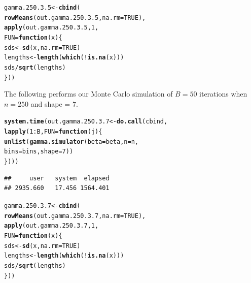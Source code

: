 \documentclass[11pt]{article}\usepackage[]{graphicx}\usepackage[]{color}
\makeatletter
\newcommand{\hlnum}[1]{\textcolor[rgb]{0.686,0.059,0.569}{#1}}%
\newcommand{\hlopt}[1]{\textcolor[rgb]{0,0,0}{#1}}%
\newcommand{\hlstd}[1]{\textcolor[rgb]{0.345,0.345,0.345}{#1}}%
\newcommand{\hlkwa}[1]{\textcolor[rgb]{0.161,0.373,0.58}{\textbf{#1}}}%
\newcommand{\hlkwb}[1]{\textcolor[rgb]{0.69,0.353,0.396}{#1}}%
\newcommand{\hlkwc}[1]{\textcolor[rgb]{0.333,0.667,0.333}{#1}}%
\newcommand{\hlkwd}[1]{\textcolor[rgb]{0.737,0.353,0.396}{\textbf{#1}}}%
\newenvironment{kframe}{%
 \def\at@end@of@kframe{}%
 \ifinner\ifhmode%
  \def\at@end@of@kframe{\end{minipage}}%
  \begin{minipage}{\columnwidth}%
 \fi\fi%
 \def\FrameCommand##1{\hskip\@totalleftmargin \hskip-\fboxsep
 \colorbox{shadecolor}{##1}\hskip-\fboxsep
     \hskip-\linewidth \hskip-\@totalleftmargin \hskip\columnwidth}%
 \MakeFramed {\advance\hsize-\width
   \@totalleftmargin\z@ \linewidth\hsize
   \@setminipage}}%
 {\par\unskip\endMakeFramed%
 \at@end@of@kframe}
\newenvironment{knitrout}{}{} %
\makeatother
\begin{document}
\begin{knitrout}
\color{fgcolor}\begin{kframe}
\begin{alltt}
\hlstd{gamma.250.3.5} \hlkwb{<-} \hlkwd{cbind}\hlstd{(}
  \hlkwd{rowMeans}\hlstd{(out.gamma.250.3.5,} \hlkwc{na.rm} \hlstd{=} \hlnum{TRUE}\hlstd{),}
  \hlkwd{apply}\hlstd{(out.gamma.250.3.5,} \hlnum{1}\hlstd{,}
  \hlkwc{FUN} \hlstd{=} \hlkwa{function}\hlstd{(}\hlkwc{x}\hlstd{)\{}
    \hlstd{sds} \hlkwb{<-} \hlkwd{sd}\hlstd{(x,} \hlkwc{na.rm} \hlstd{=} \hlnum{TRUE}\hlstd{)}
    \hlstd{lengths} \hlkwb{<-} \hlkwd{length}\hlstd{(}\hlkwd{which}\hlstd{(}\hlopt{!}\hlkwd{is.na}\hlstd{(x)))}
    \hlstd{sds} \hlopt{/} \hlkwd{sqrt}\hlstd{(lengths)}
  \hlstd{\}))}
\end{alltt}
\end{kframe}
\end{knitrout}

The following performs our Monte Carlo simulation of $B = 50$ iterations 
when $n = 250$ and shape = $7$.

\begin{knitrout}
\color{fgcolor}\begin{kframe}
\begin{alltt}
\hlkwd{system.time}\hlstd{(out.gamma.250.3.7} \hlkwb{<-} \hlkwd{do.call}\hlstd{(cbind,}
  \hlkwd{lapply}\hlstd{(}\hlnum{1}\hlopt{:}\hlstd{B,} \hlkwc{FUN} \hlstd{=} \hlkwa{function}\hlstd{(}\hlkwc{j}\hlstd{)\{}
    \hlkwd{unlist}\hlstd{(}\hlkwd{gamma.simulator}\hlstd{(}\hlkwc{beta} \hlstd{= beta,} \hlkwc{n} \hlstd{= n,}
      \hlkwc{bins} \hlstd{= bins,} \hlkwc{shape} \hlstd{=} \hlnum{7}\hlstd{))}
\hlstd{\})))}
\end{alltt}
\begin{verbatim}
##     user   system  elapsed 
## 2935.660   17.456 1564.401
\end{verbatim}
\end{kframe}
\end{knitrout}

\begin{knitrout}
\color{fgcolor}\begin{kframe}
\begin{alltt}
\hlstd{gamma.250.3.7} \hlkwb{<-} \hlkwd{cbind}\hlstd{(}
  \hlkwd{rowMeans}\hlstd{(out.gamma.250.3.7,} \hlkwc{na.rm} \hlstd{=} \hlnum{TRUE}\hlstd{),}
  \hlkwd{apply}\hlstd{(out.gamma.250.3.7,} \hlnum{1}\hlstd{,}
  \hlkwc{FUN} \hlstd{=} \hlkwa{function}\hlstd{(}\hlkwc{x}\hlstd{)\{}
    \hlstd{sds} \hlkwb{<-} \hlkwd{sd}\hlstd{(x,} \hlkwc{na.rm} \hlstd{=} \hlnum{TRUE}\hlstd{)}
    \hlstd{lengths} \hlkwb{<-} \hlkwd{length}\hlstd{(}\hlkwd{which}\hlstd{(}\hlopt{!}\hlkwd{is.na}\hlstd{(x)))}
    \hlstd{sds} \hlopt{/} \hlkwd{sqrt}\hlstd{(lengths)}
  \hlstd{\}))}
\end{alltt}
\end{kframe}
\end{knitrout}
\end{document}
